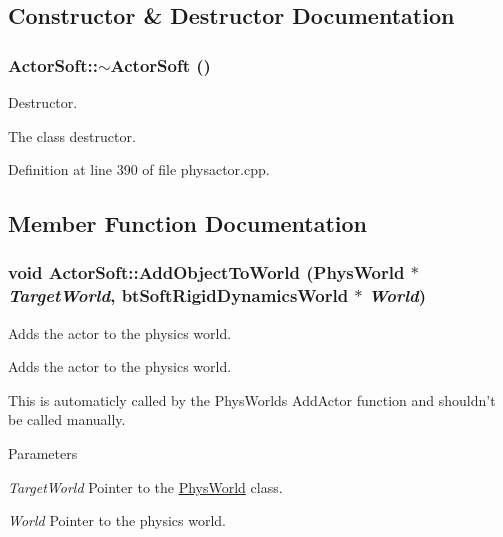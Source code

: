 \subsection{Constructor \& Destructor Documentation}
\hypertarget{classActorSoft_af58881c064fa2182a2347eb8755696b0}{
\subsubsection[{$\sim$ActorSoft}]{\setlength{\rightskip}{0pt plus 5cm}ActorSoft::$\sim$ActorSoft ()}}
\label{d5/da4/classActorSoft_af58881c064fa2182a2347eb8755696b0}


Destructor. 

The class destructor. 

Definition at line 390 of file physactor.cpp.



\subsection{Member Function Documentation}
\hypertarget{classActorSoft_a0def29f28ed4d126a0634ddc97e33e2f}{
\subsubsection[{AddObjectToWorld}]{\setlength{\rightskip}{0pt plus 5cm}void ActorSoft::AddObjectToWorld ({\bf PhysWorld} $\ast$ {\em TargetWorld}, \/  btSoftRigidDynamicsWorld $\ast$ {\em World})}}
\label{d5/da4/classActorSoft_a0def29f28ed4d126a0634ddc97e33e2f}


Adds the actor to the physics world. 

Adds the actor to the physics world. \par
 This is automaticly called by the PhysWorlds AddActor function and shouldn't be called manually. 
\begin{DoxyParams}{Parameters}
\item[{\em TargetWorld}]Pointer to the \hyperlink{classPhysWorld}{PhysWorld} class. \item[{\em World}]Pointer to the physics world. \end{DoxyParams}


